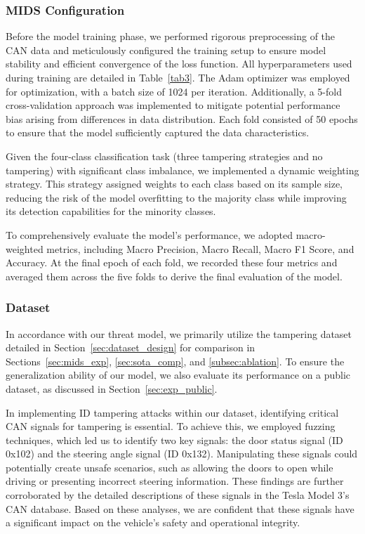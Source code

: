 \documentclass[lettersize,journal]{IEEEtran}
\begin{document}
\subsubsection{MIDS Configuration}

Before the model training phase, we performed rigorous preprocessing of the CAN data and meticulously configured the training setup to ensure model stability and efficient convergence of the loss function. All hyperparameters used during training are detailed in Table~\ref{tab3}. The Adam optimizer was employed for optimization, with a batch size of 1024 per iteration. Additionally, a 5-fold cross-validation approach was implemented to mitigate potential performance bias arising from differences in data distribution. Each fold consisted of 50 epochs to ensure that the model sufficiently captured the data characteristics.

Given the four-class classification task (three tampering strategies and no tampering) with significant class imbalance, we implemented a dynamic weighting strategy. This strategy assigned weights to each class based on its sample size, reducing the risk of the model overfitting to the majority class while improving its detection capabilities for the minority classes.

To comprehensively evaluate the model’s performance, we adopted macro-weighted metrics, including Macro Precision, Macro Recall, Macro F1 Score, and Accuracy. At the final epoch of each fold, we recorded these four metrics and averaged them across the five folds to derive the final evaluation of the model.

\subsubsection{Dataset}

In accordance with our threat model, we primarily utilize the tampering dataset detailed in Section~\ref{sec:dataset_design} for comparison in Sections~\ref{sec:mids_exp}, \ref{sec:sota_comp}, and \ref{subsec:ablation}. To ensure the generalization ability of our model, we also evaluate its performance on a public dataset, as discussed in Section~\ref{sec:exp_public}.

In implementing ID tampering attacks within our dataset, identifying critical CAN signals for tampering is essential. To achieve this, we employed fuzzing techniques, which led us to identify two key signals: the door status signal (ID 0x102) and the steering angle signal (ID 0x132). Manipulating these signals could potentially create unsafe scenarios, such as allowing the doors to open while driving or presenting incorrect steering information. These findings are further corroborated by the detailed descriptions of these signals in the Tesla Model 3's CAN database. Based on these analyses, we are confident that these signals have a significant impact on the vehicle's safety and operational integrity.
\end{document}
